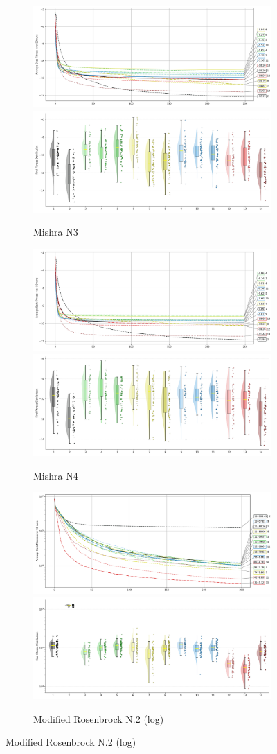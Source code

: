 \begin{figure}[p]
\begin{subfigure}{1\textwidth}
    \centering
    \includegraphics[width=.49\textwidth]{Figures/results/500/Mishra_N3_All_selected_algorithms_dim500_annot_legend.png}
    \includegraphics[width=.49\textwidth]{Figures/results/500/Mishra_N3_all_dim500_raincloud_vertical.png}
    \caption{Mishra N3}
\end{subfigure}

\begin{subfigure}{1\textwidth}
    \centering
    \includegraphics[width=.49\textwidth]{Figures/results/500/Mishra_N4_All_selected_algorithms_dim500_annot_legend.png}
    \includegraphics[width=.49\textwidth]{Figures/results/500/Mishra_N4_all_dim500_raincloud_vertical.png}
    \caption{Mishra N4}
\end{subfigure}

\begin{subfigure}{1\textwidth}
    \centering
    \includegraphics[width=.49\textwidth]{Figures/results/500/Modified_Rosenbrock_No.02___Hollow_Ground_Bent_Knife_Edge_All_selected_algorithms_dim500_annot_legend.png}
    \includegraphics[width=.49\textwidth]{Figures/results/500/Modified_Rosenbrock_No.02___Hollow_Ground_Bent_Knife_Edge_all_dim500_raincloud_vertical.png}
    \caption{Modified Rosenbrock N.2 (log)}
\end{subfigure}


\end{figure}
